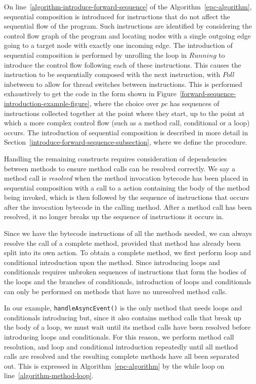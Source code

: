 On line~\ref{algorithm-introduce-forward-sequence} of the
Algorithm~\ref{epc-algorithm}, sequential composition is introduced
for instructions that do not affect the sequential flow of the
program.
Such instructions are identified by considering the control flow graph
of the program and locating nodes with a single outgoing edge going to
a target node with exactly one incoming edge.
The introduction of sequential composition is performed by unrolling
the loop in $Running$ to introduce the control flow following each of
these instructions.
This causes the instruction to be sequentially composed with the next
instruction, with $Poll$ inbetween to allow for thread switches
between instructions.
This is performed exhaustively to get the code in the form shown in
Figure~\ref{forward-sequence-introduction-example-figure}, where the
choice over $pc$ has sequences of instructions collected together at
the point where they start, up to the point at which a more complex
control flow (such as a method call, conditional or a loop) occurs.
The introduction of sequential composition is described in more detail
in Section~\ref{introduce-forward-sequence-subsection}, where we
define the  procedure.

Handling the remaining constructs requires consideration of
dependencies between methods to ensure method calls can be resolved
correctly.
We say a method call is \emph{resolved} when the method invocation
bytecode has been placed in sequential composition with a call to a
\Circus{} action containing the body of the method being invoked,
which is then followed by the sequence of instructions that occurs
after the invocation bytecode in the calling method.
After a method call has been resolved, it no longer breaks up the
sequence of instructions it occurs in.

Since we have the bytecode instructions of all the methods needed, we
can always resolve the call of a complete method, provided that method
has already been split into its own \Circus{} action.
To obtain a complete method, we first perform loop and conditional
introduction upon the method.
Since introducing loops and conditionals requires unbroken sequences
of instructions that form the bodies of the loops and the branches of
conditionals, introduction of loops and conditionals can only be
performed on methods that have no unresolved method calls.

In our example, \texttt{handleAsyncEvent()} is the only method that
needs loops and conditionals introducing but, since it also contains
method calls that break up the body of a loop, we must wait until its
method calls have been resolved before introducing loops and
conditionals.
For this reason, we perform method call resolution, and loop and
conditional introduction repeatedly until all method calls are
resolved and the resulting complete methods have all been separated
out.
This is expressed in Algorithm~\ref{epc-algorithm} by the while loop
on line~\ref{algorithm-method-loop}.

